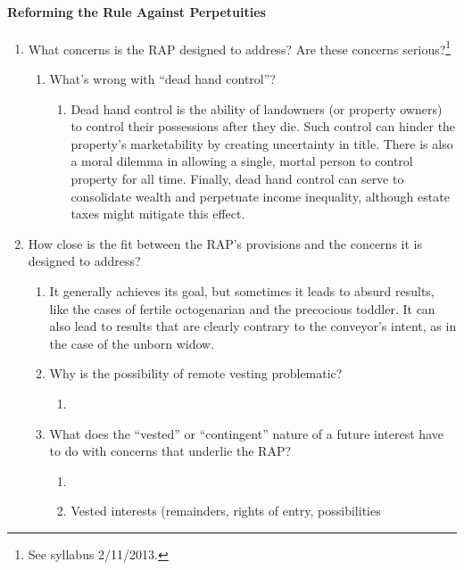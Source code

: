 \paragraph{Reforming the Rule Against Perpetuities}

\begin{enumerate}
    \item What concerns is the RAP designed to address? Are these concerns 
    serious?\footnote{See syllabus 2/11/2013.}
    \begin{enumerate}
        \item What's wrong with ``dead hand control''?
        \begin{enumerate}
            \item Dead hand control is the ability of landowners (or property 
            owners) to control their possessions after they die. Such control 
            can hinder the property's marketability by creating uncertainty in 
            title. There is also a moral dilemma in allowing a single, mortal 
            person to control property for all time. Finally, dead hand 
            control can serve to consolidate wealth and perpetuate income 
            inequality, although estate taxes might mitigate this effect.
        \end{enumerate}
    \end{enumerate}
    \item How close is the fit between the RAP's provisions and the concerns 
    it is designed to address?
    \begin{enumerate}
        \item It generally achieves its goal, but sometimes it leads to absurd 
        results, like the cases of fertile octogenarian and the precocious 
        toddler. It can also lead to results that are clearly contrary to the 
        conveyor's intent, as in the case of the unborn widow.
        \item Why is the possibility of remote vesting problematic?
        \begin{enumerate}
            \item %
        \end{enumerate}
        \item What does the ``vested'' or ``contingent'' nature of a future 
        interest have to do with concerns that underlie the RAP?
        \begin{enumerate}
            \item %
            \item Vested interests (remainders, rights of entry, possibilities 

\end{enumerate}
\end{enumerate}
\end{enumerate}
